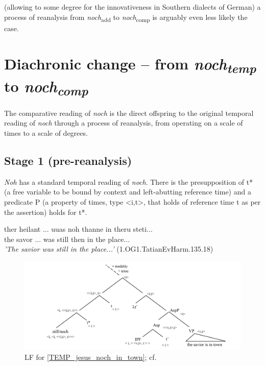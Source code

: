 \documentclass[output=paper,
modfonts
]{langscibook}
\begin{document}
(allowing to some degree for the innovativeness in Southern dialects of German) a process of reanalysis from \textit{noch}\textsubscript{add} to \textit{noch}\textsubscript{comp} is arguably even less likely the case.



\section{Diachronic change -- from \textit{noch\textsubscript{temp}} to \textit{noch\textsubscript{comp}}}\label{sec_diachr_analysis}

The comparative reading of \textit{noch} is the direct offspring to the original temporal reading of \textit{noch} through a process of reanalysis, from operating on a scale of times to a scale of degrees.

\subsection{Stage 1 (pre-reanalysis)} \textit{Noh} has a standard temporal reading of \textit{noch}. There is the presupposition of t* (a free variable to be bound by context and left-abutting reference time) and a predicate P (a property of times, type <i,t>, that holds of reference time t as per the assertion) holds for t*.

\ea\gll ther heilant ... uuas noh thanne in theru steti...\\
       the savor ... was still then in the place...\\
\glt   \textit{'The savior was still in the place...'}
(1.OG1.TatianEvHarm.135.18)\label{TEMP_jesus_noch_in_town}
\z

\begin{figure}
\includegraphics[width=1\textwidth]{figures/LF0_temp}
\caption{LF for \ref{TEMP_jesus_noch_in_town}; cf. \citep{beck2016a_sub}}
\label{fig:LF_TEMP_jesus_noch_in_town}
\end{figure}
\end{document}
